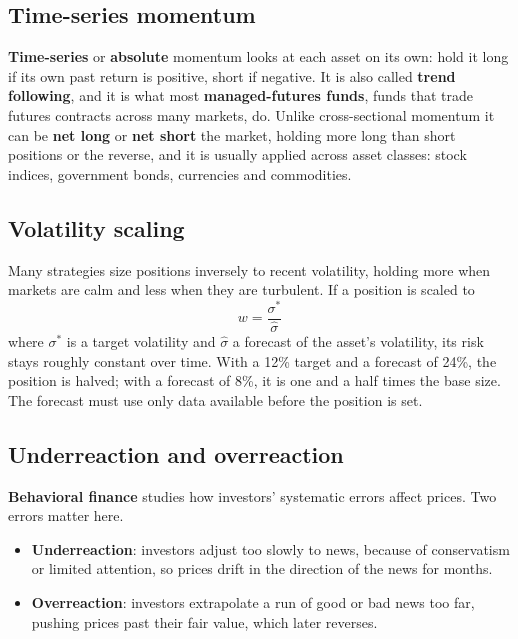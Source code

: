 \subsection{Time-series momentum}

\textbf{Time-series} or \textbf{absolute} momentum looks at each asset on its own: hold it long if its own past return is positive, short if negative. It is also called \textbf{trend following}, and it is what most \textbf{managed-futures funds}, funds that trade futures contracts across many markets, do. Unlike cross-sectional momentum it can be \textbf{net long} or \textbf{net short} the market, holding more long than short positions or the reverse, and it is usually applied across asset classes: stock indices, government bonds, currencies and commodities.

\subsection{Volatility scaling}

Many strategies size positions inversely to recent volatility, holding more when markets are calm and less when they are turbulent. If a position is scaled to
\begin{equation}
  w = \frac{\sigma^*}{\hat\sigma}
  \label{eq:09-volscale}
\end{equation}
where $\sigma^*$ is a target volatility and $\hat\sigma$ a forecast of the asset's volatility, its risk stays roughly constant over time. With a 12\% target and a forecast of 24\%, the position is halved; with a forecast of 8\%, it is one and a half times the base size. The forecast must use only data available before the position is set.

\subsection{Underreaction and overreaction}
\label{sec:09-behavior}

\textbf{Behavioral finance} studies how investors' systematic errors affect prices. Two errors matter here.

\begin{itemize}
  \item \textbf{Underreaction}: investors adjust too slowly to news, because of conservatism or limited attention, so prices drift in the direction of the news for months.
  \item \textbf{Overreaction}: investors extrapolate a run of good or bad news too far, pushing prices past their fair value, which later reverses.
\end{itemize}

